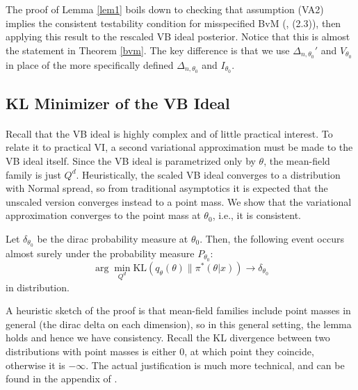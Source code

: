 The proof of Lemma \ref{lem1} boils down to checking that assumption (VA2) implies the consistent testability condition for misspecified BvM (\cite{kleijn2012}, (2.3)), then applying this result to the rescaled VB ideal posterior. Notice that this is almost the statement in Theorem \ref{bvm}. The key difference is that we use $\Delta_{n, \theta_0}'$ and $V_{\theta_0}$ in place of the more specifically defined $\Delta_{n, \theta_0}$ and $I_{\theta_0}$.

\subsection{KL Minimizer of the VB Ideal}

\paragraph{} Recall that the VB ideal is highly complex and of little practical interest. To relate it to practical VI, a second variational approximation must be made to the VB ideal itself. Since the VB ideal is parametrized only by $\theta$, the mean-field family is just $Q^d$. Heuristically, the scaled VB ideal converges to a distribution with Normal spread, so from traditional asymptotics it is expected that the unscaled version converges instead to a point mass. We show that the variational approximation converges to the point mass at $\theta_0$, i.e., it is consistent.

\begin{lemma}
	\label{lem2}
	Let $\delta_{\theta_0}$ be the dirac probability measure at $\theta_0$. Then, the following event occurs almost surely under the probability measure $P_{\theta_0}$:
	\begin{equation*}
	\arg\min_{Q^{d}} \text{KL}(q_{\theta}(\theta) \| \pi^*(\theta|x)) \to \delta_{\theta_0}
	\end{equation*}
	in distribution.
\end{lemma}

A heuristic sketch of the proof is that mean-field families include point masses in general (the dirac delta on each dimension), so in this general setting, the lemma holds and hence we have consistency. Recall the KL divergence between two distributions with point masses is either 0, at which point they coincide, otherwise it is $-\infty$. The actual justification is much more technical, and can be found in the appendix of \cite{Wang:2019:VBVM}. 

